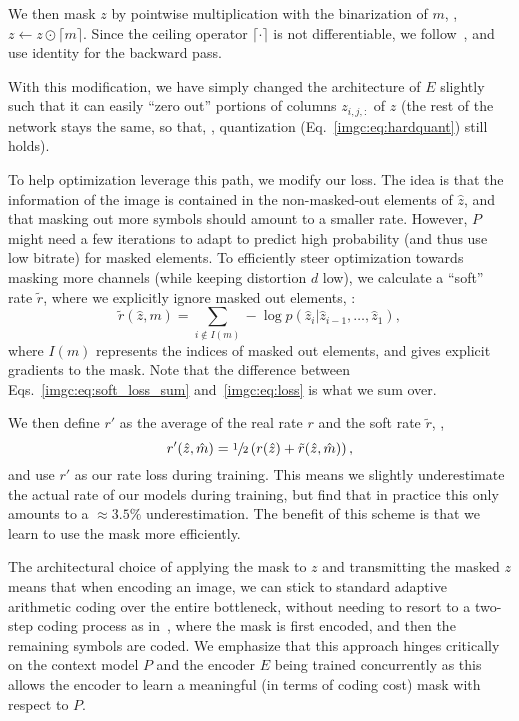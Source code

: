 We then mask $z$ by pointwise multiplication with the binarization of $m$, \ie, $z \leftarrow z \odot \lceil m \rceil$.
Since the ceiling operator $\lceil \cdot \rceil$ is not differentiable, we follow~\cite{theis2017lossy,li2017learning}, and use identity for the backward pass. 

With this modification, we have simply changed the architecture of $E$ slightly
such that it can easily ``zero out'' portions of columns $z_{i,j,:}$ of
$z$ (the rest of the network stays the same, so that, \eg,
quantization (Eq.~\eqref{imgc:eq:hardquant}) still holds).

To help optimization leverage this path, we modify our loss.
The idea is that the information of the image is contained in the non-masked-out 
elements of $\hat z$, and that masking out more symbols should amount to a
smaller rate. However, $P$ might need a few iterations to adapt to predict high
probability (and thus use low bitrate) for masked elements. To efficiently steer
optimization towards masking more channels (while keeping distortion $d$ low), we calculate a ``soft'' rate
$\tilde r$, where we explicitly ignore masked out elements,  \ie:
\begin{equation}
    \tilde r(\hat z, m) = 
        \sum_{i \notin I(m)} - \log p(\hat z_i | \hat z_{i-1}, \dots, \hat z_1) ,
            \label{imgc:eq:soft_loss_sum}
\end{equation}
where $I(m)$ represents the indices of masked out elements, and gives explicit gradients to the mask.
Note that the difference between Eqs.~\eqref{imgc:eq:soft_loss_sum} and~\eqref{imgc:eq:loss} is what we sum over.

We then define $r'$ as the average of the real rate $r$ and the soft rate $\tilde r$, \ie,
\begin{equation}
    r'(\hat z, \hat m) = \sfrac{1}{2} \left( r(\hat z) + \tilde r(\hat z, \hat m ) \right), \label{imgc:eq:softrate}
\end{equation}
and use $r'$ as our rate loss during training. This means we slightly underestimate the actual rate of our models during training, but find that in practice this only amounts to a ${\approx}3.5\%$ underestimation. The benefit of this scheme is that we learn to use the mask more efficiently.

The architectural choice of applying the mask to $z$ and transmitting the masked $z$ means that when encoding an image, we can stick to standard adaptive arithmetic coding over the entire bottleneck, without needing to resort to a two-step coding process as in~\cite{li2017learning}, where the mask is first encoded, and then the remaining symbols are coded. We emphasize that this approach hinges critically on the context model $P$ and the encoder $E$ being trained concurrently as this allows the encoder to learn a meaningful (in terms of coding cost) mask with respect to $P$.

